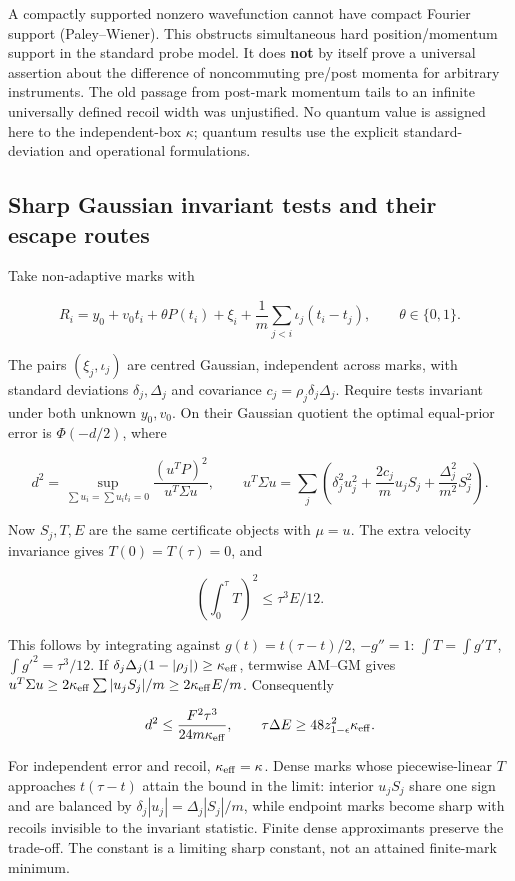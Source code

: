 \documentclass[11pt,a4paper]{article}
\begin{document}
A compactly supported nonzero wavefunction cannot have compact Fourier
support (Paley--Wiener). This obstructs simultaneous hard
position/momentum support in the standard probe model. It does
\textbf{not} by itself prove a universal assertion about the difference
of noncommuting pre/post momenta for arbitrary instruments. The old
passage from post-mark momentum tails to an infinite universally defined
recoil width was unjustified. No quantum value is assigned here to the
independent-box \(\kappa\); quantum results use the explicit
standard-deviation and operational formulations.

\hypertarget{sharp-gaussian-invariant-tests-and-their-escape-routes}{%
\subsection{Sharp Gaussian invariant tests and their escape
routes}\label{sharp-gaussian-invariant-tests-and-their-escape-routes}}

Take non-adaptive marks with

\[R_i=y_0+v_0t_i+\theta P(t_i)+\xi_i
 +\frac1m\sum_{j<i}\iota_j(t_i-t_j),\qquad\theta\in\{0,1\}.\]

The pairs \((\xi_j,\iota_j)\) are centred Gaussian, independent across
marks, with standard deviations \(\delta_j,\Delta_j\) and covariance
\(c_j=\rho_j\delta_j\Delta_j\). Require tests invariant under both
unknown \(y_0,v_0\). On their Gaussian quotient the optimal equal-prior
error is \(\Phi(-d/2)\), where

\[d^2=\sup_{\sum u_i=\sum u_it_i=0}
 \frac{(u^TP)^2}{u^T\Sigma u},\qquad
u^T\Sigma u=\sum_j\left(\delta_j^2u_j^2+
 \frac{2c_j}{m}u_jS_j+\frac{\Delta_j^2}{m^2}S_j^2\right).\]

Now \(S_j,T,E\) are the same certificate objects with \(\mu=u\). The
extra velocity invariance gives \(T(0)=T(\tau)=0\), and

\[(\int_0^\tau T)^2\le\tau^3E/12.\]

This follows by integrating against \(g(t)=t(\tau-t)/2\), \(-g''=1\):
\(\int T=\int g'T'\), \(\int g'^2=\tau^3/12\). If
\(\delta_j\Delta_j(1-|\rho_j|)\ge\kappa_{\rm eff}\), termwise AM--GM
gives
\(u^T\Sigma u\ge2\kappa_{\rm eff}\sum|u_jS_j|/m\ge2\kappa_{\rm eff}E/m\).
Consequently

\[d^2\le\frac{F^2\tau^3}{24m\kappa_{\rm eff}},\qquad
\tau\Delta E\ge48z_{1-\epsilon}^2\kappa_{\rm eff}.\]

For independent error and recoil, \(\kappa_{\rm eff}=\kappa\). Dense
marks whose piecewise-linear \(T\) approaches \(t(\tau-t)\) attain the
bound in the limit: interior \(u_jS_j\) share one sign and are balanced
by \(\delta_j|u_j|=\Delta_j|S_j|/m\), while endpoint marks become sharp
with recoils invisible to the invariant statistic. Finite dense
approximants preserve the trade-off. The constant is a limiting sharp
constant, not an attained finite-mark minimum.
\end{document}
